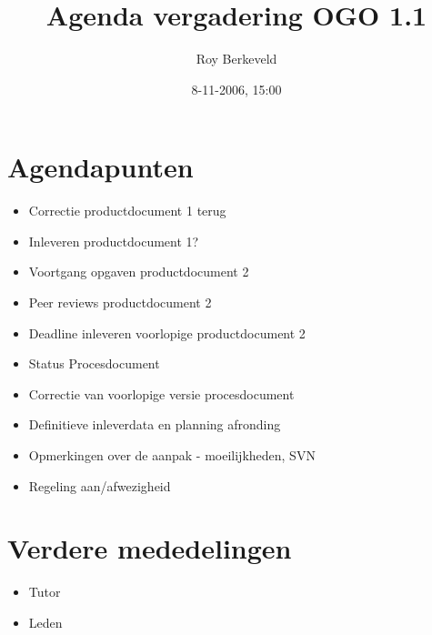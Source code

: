 \documentclass[10pt]{article}
\title{Agenda vergadering OGO 1.1}
\author{Roy Berkeveld}
\date{8-11-2006, 15:00}
\begin{document}
\maketitle

\section{Agendapunten}

\begin{itemize}
\item Correctie productdocument 1 terug \\
\item Inleveren productdocument 1? \\
\item Voortgang opgaven productdocument 2 \\
\item Peer reviews productdocument 2 \\
\item Deadline inleveren voorlopige productdocument 2 \\
\item Status Procesdocument \\
\item Correctie van voorlopige versie procesdocument \\
\item Definitieve inleverdata en planning afronding \\
\item Opmerkingen over de aanpak - moeilijkheden, SVN \\
\item Regeling aan/afwezigheid \\
\end{itemize}

\section{Verdere mededelingen}
\begin{itemize}
\item Tutor \\
\item Leden \\
\end{itemize}
\end{document}
